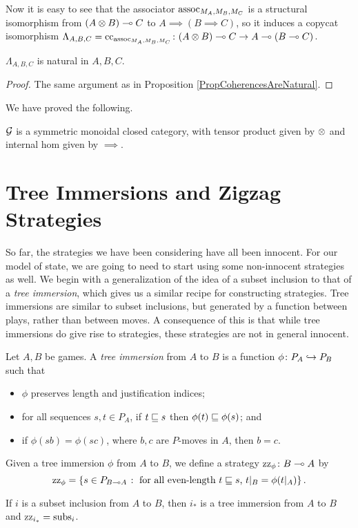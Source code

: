 Now it is easy to see that the associator $\operatorname{assoc}_{M_A,M_B,M_C}$ is a structural isomorphism from $(A\otimes B) \multimap C$ to $A\implies (B\implies C)$, so it induces a copycat isomorphism $\Lambda_{A,B,C}=\operatorname{cc}_{\operatorname{assoc}_{M_A,M_B,M_C}} \colon (A\otimes B) \multimap C \to A \multimap (B\multimap C)$.

\begin{proposition}
  $\Lambda_{A,B,C}$ is natural in $A,B,C$.
\end{proposition}
\begin{proof}
  The same argument as in Proposition \ref{PropCoherencesAreNatural}.
\end{proof}

We have proved the following.

\begin{theorem}
  $\mathcal G$ is a symmetric monoidal closed category, with tensor product given by $\otimes$ and internal hom given by $\implies$.
\end{theorem}

\section{Tree Immersions and Zigzag Strategies}

So far, the strategies we have been considering have all been innocent.  
For our model of state, we are going to need to start using some non-innocent strategies as well.  
We begin with a generalization of the idea of a subset inclusion to that of a \emph{tree immersion}, which gives us a similar recipe for constructing strategies.  
Tree immersions are similar to subset inclusions, but generated by a function between plays, rather than between moves.  
A consequence of this is that while tree immersions do give rise to strategies, these strategies are not in general innocent.

\begin{definition}
  Let $A,B$ be games.  
  A \emph{tree immersion} from $A$ to $B$ is a function $\phi\colon P_A \hookrightarrow P_B$ such that
  \begin{itemize}
    \item $\phi$ preserves length and justification indices; 
    \item for all sequences $s,t\in P_A$, if $t\sqsubseteq s$ then $\phi(t)\sqsubseteq\phi(s)$; and
    \item if $\phi(sb)=\phi(sc)$, where $b,c$ are $P$-moves in $A$, then $b=c$.
  \end{itemize}

  Given a tree immersion $\phi$ from $A$ to $B$, we define a strategy $\operatorname{zz}_\phi\colon B \multimap A$ by
  \[
    \operatorname{zz}_\phi = \{s\in P_{B\multimap A}\;\colon\;\text{for all even-length $t\sqsubseteq s$, $t\vert_B=\phi(t\vert_A)$}\}\,.
    \]
\end{definition}
\begin{example}
  If $i$ is a subset inclusion from $A$ to $B$, then $i_*$ is a tree immersion from $A$ to $B$ and $\operatorname{zz}_{i_*}=\operatorname{subs}_i$.
\end{example}

